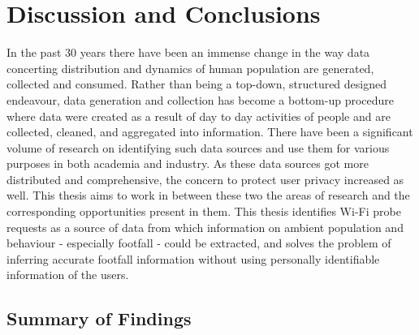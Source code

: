 \chapter{Discussion and Conclusions}
In the past 30 years there have been an immense change in the way data concerting distribution and dynamics of human population are generated, collected and consumed.
Rather than being a top-down, structured designed endeavour, data generation and collection has become a bottom-up procedure where data were created as a result of day to day activities of people and are collected, cleaned, and  aggregated into information.
There have been a significant volume of research on identifying such data sources and use them for various purposes in both academia and industry.
As these data sources got more distributed and comprehensive, the concern to protect user privacy increased as well.
This thesis aims to work in between these two the areas of research and the corresponding opportunities present in them.
This thesis identifies Wi-Fi probe requests as a source of data from which information on ambient population and behaviour - especially footfall - could be extracted, and solves the problem of inferring accurate footfall information without using personally identifiable information of the users.

\section{Summary of Findings}

